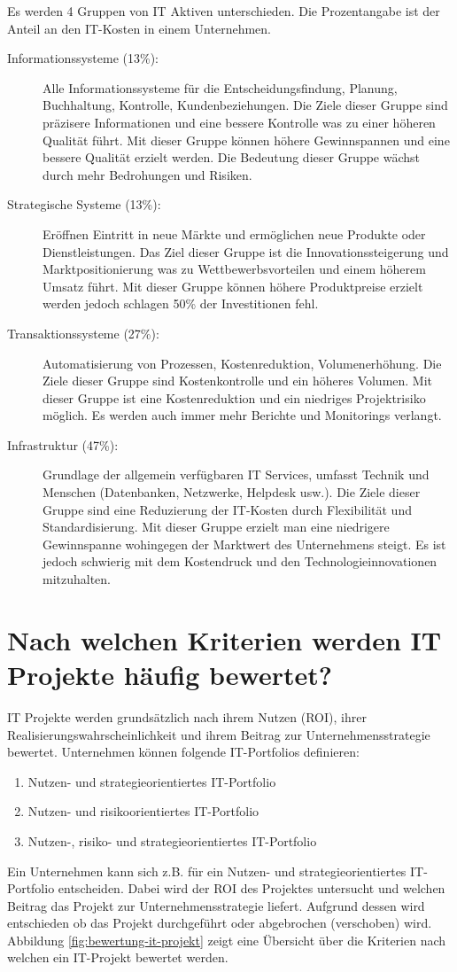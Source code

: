 Es werden 4 Gruppen von IT Aktiven unterschieden. Die Prozentangabe ist der Anteil an den IT-Kosten in einem Unternehmen.
\begin{description}
	\item[Informationssysteme (13\%):] Alle Informationssysteme für die Entscheidungsfindung, Planung, Buchhaltung, Kontrolle, Kundenbeziehungen. Die Ziele dieser Gruppe sind präzisere Informationen und eine bessere Kontrolle was zu einer höheren Qualität führt. Mit dieser Gruppe können höhere Gewinnspannen und eine bessere Qualität erzielt werden. Die Bedeutung dieser Gruppe wächst durch mehr Bedrohungen und Risiken.
	\item[Strategische Systeme (13\%):] Eröffnen Eintritt in neue Märkte und ermöglichen neue Produkte oder Dienstleistungen. Das Ziel dieser Gruppe ist die Innovationssteigerung und Marktpositionierung was zu Wettbewerbsvorteilen und einem höherem Umsatz führt. Mit dieser Gruppe können höhere Produktpreise erzielt werden jedoch schlagen 50\% der Investitionen fehl.
	\item[Transaktionssysteme (27\%):] Automatisierung von Prozessen, Kostenreduktion, Volumenerhöhung. Die Ziele dieser Gruppe sind Kostenkontrolle und ein höheres Volumen. Mit dieser Gruppe ist eine Kostenreduktion und ein niedriges Projektrisiko möglich. Es werden auch immer mehr Berichte und Monitorings verlangt.
	\item[Infrastruktur (47\%):] Grundlage der allgemein verfügbaren IT Services, umfasst Technik und Menschen (Datenbanken, Netzwerke, Helpdesk usw.). Die Ziele dieser Gruppe sind eine Reduzierung der IT-Kosten durch Flexibilität und Standardisierung. Mit dieser Gruppe erzielt man eine niedrigere Gewinnspanne wohingegen der Marktwert des Unternehmens steigt. Es ist jedoch schwierig mit dem Kostendruck und den Technologieinnovationen mitzuhalten. 
\end{description}

\section{Nach welchen Kriterien werden IT Projekte häufig bewertet?}

IT Projekte werden grundsätzlich nach ihrem Nutzen (ROI), ihrer Realisierungswahrscheinlichkeit und ihrem Beitrag zur Unternehmensstrategie bewertet. Unternehmen können folgende IT-Portfolios definieren:
\begin{enumerate}
	\item Nutzen- und strategieorientiertes IT-Portfolio
	\item Nutzen- und risikoorientiertes IT-Portfolio
	\item Nutzen-, risiko- und strategieorientiertes IT-Portfolio
\end{enumerate}
Ein Unternehmen kann sich z.B. für ein Nutzen- und strategieorientiertes IT-Portfolio entscheiden. Dabei wird der ROI des Projektes untersucht und welchen Beitrag das Projekt zur Unternehmensstrategie liefert. Aufgrund dessen wird entschieden ob das Projekt durchgeführt oder abgebrochen (verschoben) wird.
Abbildung \ref{fig:bewertung-it-projekt} zeigt eine Übersicht über die Kriterien nach welchen ein IT-Projekt bewertet werden.


